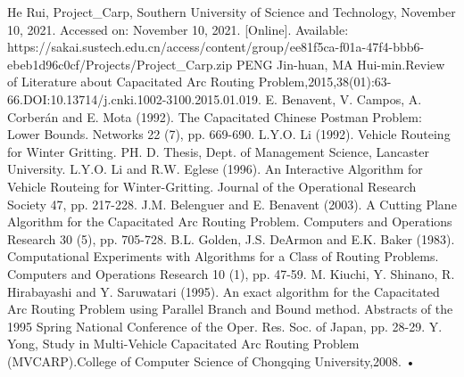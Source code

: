 \documentclass[conference,compsoc]{IEEEtran}
\begin{document}

%
%
\begin{thebibliography}{1}
 He Rui, Project\_Carp, Southern University of Science and Technology, November 10, 2021. Accessed on: November 10, 2021. [Online]. Available: https://sakai.sustech.edu.cn/access/content/group/ee81f5ca-f01a-47f4-bbb6-ebeb1d96c0cf/Projects/Project\_Carp.zip
 PENG Jin-huan, MA Hui-min.Review of Literature about Capacitated Arc Routing Problem,2015,38(01):63-66.DOI:10.13714/j.cnki.1002-3100.2015.01.019.
E. Benavent, V. Campos, A. Corberán and E. Mota (1992). The Capacitated Chinese Postman Problem: Lower Bounds. Networks 22 (7), pp. 669-690.
L.Y.O. Li (1992). Vehicle Routeing for Winter Gritting. PH. D. Thesis, Dept. of Management Science, Lancaster University.
L.Y.O. Li and R.W. Eglese (1996). An Interactive Algorithm for Vehicle Routeing for Winter-Gritting. Journal of the Operational Research Society 47, pp. 217-228.
J.M. Belenguer and E. Benavent (2003). A Cutting Plane Algorithm for the Capacitated Arc Routing Problem. Computers and Operations Research 30 (5), pp. 705-728.
B.L. Golden, J.S. DeArmon and E.K. Baker (1983). Computational Experiments with Algorithms for a Class of Routing Problems. Computers and Operations Research 10 (1), pp. 47-59.
M. Kiuchi, Y. Shinano, R. Hirabayashi and Y. Saruwatari (1995). An exact algorithm for the Capacitated Arc Routing Problem using Parallel Branch and Bound method. Abstracts of the 1995 Spring National Conference of the Oper. Res. Soc. of Japan, pp. 28-29.
Y. Yong, Study in Multi-Vehicle Capacitated Arc Routing Problem (MVCARP).College of Computer Science of Chongqing University,2008.
•
\end{thebibliography}
\newpage
\text{ }
\newpage
\end{document}
